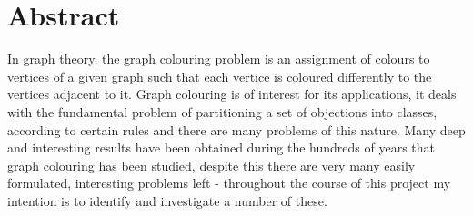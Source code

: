\documentclass[12pt, a4paper]{article}
\begin{document}
\section*{Abstract}
\hspace{\parindent}In graph theory, the graph colouring problem is an assignment of colours to vertices of a given graph such that each vertice is coloured differently to the vertices adjacent to it. Graph colouring is of interest for its applications, it deals with the fundamental problem of partitioning a set of objections into classes, according to certain rules and there are many problems of this nature. Many deep and interesting results have been obtained during the hundreds of years that graph colouring has been studied, despite this there are very many easily formulated, interesting problems left - throughout the course of this project my intention is to identify and investigate a number of these.
\newpage
\end{document}
